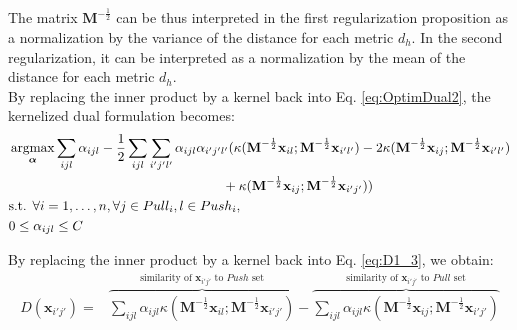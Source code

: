 \noindent The matrix $\textbf{M}^{-\frac{1}{2}}$ can be thus interpreted in the first regularization proposition as a normalization by the variance of the distance for each metric $d_h$. In the second regularization, it can be interpreted as a normalization by the mean of the distance for each metric $d_h$. \\

\noindent By replacing the inner product by a kernel back into Eq. \ref{eq:OptimDual2}, the kernelized dual formulation becomes:
\begin{equation}
\begin{aligned}
&\displaystyle \argmax_{\boldsymbol{\alpha}} 
\sum\limits_{ijl} \alpha_{ijl} 
- \frac{1}{2} 
\sum\limits_{ijl} \sum\limits_{i'j'l'}
\alpha_{ijl} \alpha_{i'j'l'}
( \kappa(\textbf{M}^{-\frac{1}{2}} \textbf{x}_{il} ;  \textbf{M}^{-\frac{1}{2}} \textbf{x}_{i'l'} )
-2\kappa(\textbf{M}^{-\frac{1}{2}} \textbf{x}_{ij} ;  \textbf{M}^{-\frac{1}{2}} \textbf{x}_{i'l'} ) \\
 & \qquad \qquad \qquad \qquad \qquad \qquad \qquad \qquad +\kappa(\textbf{M}^{-\frac{1}{2}} \textbf{x}_{ij} ;  \textbf{M}^{-\frac{1}{2}} \textbf{x}_{i'j'} ) 
)   \\
&\text{s.t.  } \forall i = 1, \ldots, n, \forall j \in Pull_i, l \in Push_i, \\
& 0 \leq \alpha_{ijl} \leq C
\end{aligned}
\label{eq:OptimDual3}
\end{equation}

\newpage
\noindent By replacing the inner product by a kernel back into Eq. \ref{eq:D1_3}, we obtain:
\begin{equation}
\begin{aligned}
D(\textbf{x}_{i'j'}) = & 
\overbrace{
	\sum\limits_{ijl} \alpha_{ijl} 
	\kappa(\textbf{M}^{-\frac{1}{2}}\textbf{x}_{il}; \textbf{M}^{-\frac{1}{2}} \textbf{x}_{i'j'})
}^{\text{similarity of $\textbf{x}_{i'j'}$ to $Push$ set}}		
- 
\overbrace{	
	\sum\limits_{ijl} \alpha_{ijl} 
	\kappa(\textbf{M}^{-\frac{1}{2}}\textbf{x}_{ij}; \textbf{M}^{-\frac{1}{2}} \textbf{x}_{i'j'})
}^{\text{similarity of $\textbf{x}_{i'j'}$ to $Pull$ set}}		\\	
\end{aligned} 
\label{Eq:nonlinearD2}
\end{equation}

